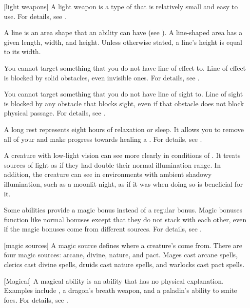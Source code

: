 [light weapons] A light weapon is a type of  that is relatively small and easy to use.
For details, see .

 A line is an area shape that an ability can have (see ).
A line-shaped area has a given length, width, and height.
Unless otherwise stated, a line's height is equal to its width.

 You cannot target something that you do not have line of effect to.
Line of effect is blocked by solid obstacles, even invisible ones.
For details, see .

 You cannot target something that you do not have line of sight to.
Line of sight is blocked by any obstacle that blocks sight, even if that obstacle does not block physical passage.
For details, see .

 A long rest represents eight hours of relaxation or sleep.
It allows you to remove all of your  and make progress towards healing a .
For details, see .

 A creature with low-light vision can see more clearly in conditions of .
It treats sources of light as if they had double their normal illumination range.
In addition, the creature can see in environments with ambient shadowy illumination, such as a moonlit night, as if it was  when doing so is beneficial for it.

 Some abilities provide a magic bonus instead of a regular bonus.
Magic bonuses function like normal bonuses except that they do not stack with each other, even if the magic bonuses come from different sources.
For details, see .

[magic sources] A magic source defines where a creature's  come from.
There are four magic sources: arcane, divine, nature, and pact.
Mages cast arcane spells, clerics cast divine spells, druids cast nature spells, and warlocks cast pact spells.

[Magical] A magical ability is an ability that has no physical explanation.
Examples include , a dragon's breath weapon, and a paladin's ability to smite foes.
For details, see .

